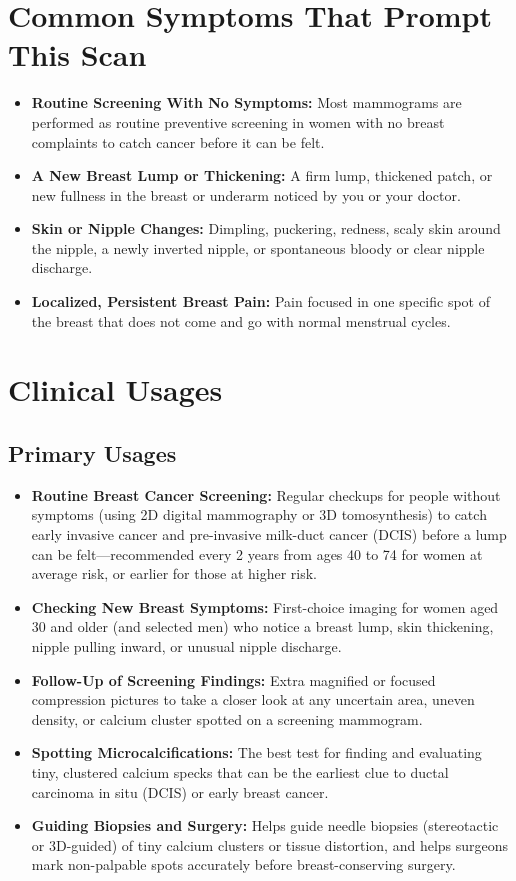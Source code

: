\section{Common Symptoms That Prompt This Scan}
\begin{itemize}
    \item \textbf{Routine Screening With No Symptoms:} Most mammograms are performed as routine preventive screening in women with no breast complaints to catch cancer before it can be felt.
    \item \textbf{A New Breast Lump or Thickening:} A firm lump, thickened patch, or new fullness in the breast or underarm noticed by you or your doctor.
    \item \textbf{Skin or Nipple Changes:} Dimpling, puckering, redness, scaly skin around the nipple, a newly inverted nipple, or spontaneous bloody or clear nipple discharge.
    \item \textbf{Localized, Persistent Breast Pain:} Pain focused in one specific spot of the breast that does not come and go with normal menstrual cycles.
\end{itemize}

\section{Clinical Usages}

\subsection{Primary Usages}

\begin{itemize}
    \item \textbf{Routine Breast Cancer Screening:} Regular checkups for people without symptoms (using 2D digital mammography or 3D tomosynthesis) to catch early invasive cancer and pre-invasive milk-duct cancer (DCIS) before a lump can be felt---recommended every 2 years from ages 40 to 74 for women at average risk, or earlier for those at higher risk.
    \item \textbf{Checking New Breast Symptoms:} First-choice imaging for women aged 30 and older (and selected men) who notice a breast lump, skin thickening, nipple pulling inward, or unusual nipple discharge.
    \item \textbf{Follow-Up of Screening Findings:} Extra magnified or focused compression pictures to take a closer look at any uncertain area, uneven density, or calcium cluster spotted on a screening mammogram.
    \item \textbf{Spotting Microcalcifications:} The best test for finding and evaluating tiny, clustered calcium specks that can be the earliest clue to ductal carcinoma in situ (DCIS) or early breast cancer.
    \item \textbf{Guiding Biopsies and Surgery:} Helps guide needle biopsies (stereotactic or 3D-guided) of tiny calcium clusters or tissue distortion, and helps surgeons mark non-palpable spots accurately before breast-conserving surgery.
\end{itemize}

